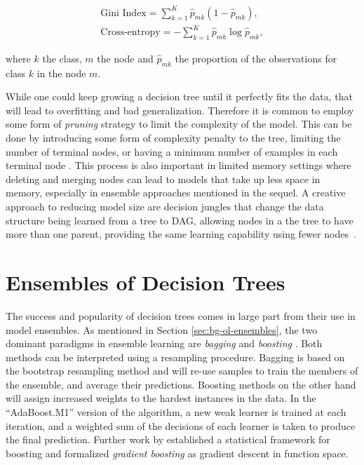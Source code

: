 \begin{equation}
	\begin{split}
		\text{Gini Index} = \sum_{k=1}^K\hat{p}_{mk}(1 - \hat{p}_{mk}), \\
		\text{Cross-entropy} = -\sum_{k=1}^K\hat{p}_{mk} \log{\hat{p}_{mk}},
	\end{split}
\end{equation}

\noindent
where $k$ the class, $m$ the node and $\hat{p}_{mk}$ the proportion of
the observations for class $k$ in the node $m$.

While one could keep growing a decision tree until it perfectly fits the data,
that will lead to overfitting and bad generalization. Therefore
it is common to employ some form of \emph{pruning} strategy to limit the
complexity of the model. This can be done by introducing some
form of complexity penalty to the tree, limiting the number of terminal
nodes, or having a minimum number of examples in each terminal node
\cite{breiman1984cart}. This process is also important in limited
memory settings where deleting and merging nodes can lead to models
that take up less space in memory, especially in ensemble approaches
mentioned in the sequel. A creative approach to reducing model size are decision
jungles that change the data structure being learned from a tree to DAG, allowing
nodes in a the tree to have more than one parent,
providing the same learning capability using fewer nodes~\cite{decision-jungles}.


\section{Ensembles of Decision Trees}
\label{sec:bg-dt-ensembles}

The success and popularity of decision trees comes in large part
from their use in model ensembles.
As mentioned in Section \ref{sec:bg-ol-ensembles}, the two dominant paradigms in ensemble learning are \emph{bagging} \cite{bagging} and
\emph{boosting} \cite{boosting-schapire, boosting-freund-schapire}. Both
methods can be interpreted using a resampling procedure. Bagging is
based on the bootstrap \cite{bootstrap} resampling method and will re-use samples
to train the members of the ensemble, and average their predictions.
Boosting methods on the other hand will assign increased weights to the
hardest instances in the data. In the ``AdaBoost.M1'' version of the algorithm,
a new weak learner is trained at each iteration, and a weighted sum of
the decisions of each learner is taken to produce the final prediction.
Further work by \citet{gradient-boosting-breiman} established a statistical framework
for boosting and formalized \emph{gradient boosting} as gradient descent in function
space.

